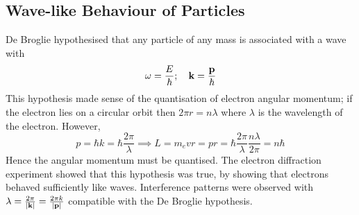 \subsection{Wave-like Behaviour of Particles}
De Broglie hypothesised that any particle of any mass is associated with a wave with
\[
	\omega = \frac{E}{\hbar}; \quad \vb k = \frac{\vb p}{\hbar}
\]
This hypothesis made sense of the quantisation of electron angular momentum; if the electron lies on a circular orbit then \( 2 \pi r = n \lambda \) where \( \lambda \) is the wavelength of the electron.
However,
\[
	p = \hbar k = \hbar \frac{2 \pi}{\lambda} \implies L = m_e v r = p r = \hbar \frac{2 \pi}{\lambda} \frac{n \lambda}{2 \pi} = n \hbar
\]
Hence the angular momentum must be quantised.
The electron diffraction experiment showed that this hypothesis was true, by showing that electrons behaved sufficiently like waves.
Interference patterns were observed with \( \lambda = \frac{2 \pi}{\abs{\vb k}} = \frac{2 \pi k}{\abs{\vb p}} \) compatible with the De Broglie hypothesis.

